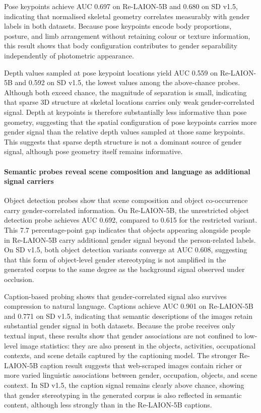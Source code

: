 Pose keypoints achieve AUC 0.697 on Re-LAION-5B and 0.680 on SD v1.5, indicating that normalised skeletal geometry correlates measurably with gender labels in both datasets. Because pose keypoints encode body proportions, posture, and limb arrangement without retaining colour or texture information, this result shows that body configuration contributes to gender separability independently of photometric appearance.

Depth values sampled at pose keypoint locations yield AUC 0.559 on Re-LAION-5B and 0.592 on SD v1.5, the lowest values among the above-chance probes. Although both exceed chance, the magnitude of separation is small, indicating that sparse 3D structure at skeletal locations carries only weak gender-correlated signal. Depth at keypoints is therefore substantially less informative than pose geometry, suggesting that the spatial configuration of pose keypoints carries more gender signal than the relative depth values sampled at those same keypoints. This suggests that sparse depth structure is not a dominant source of gender signal, although pose geometry itself remains informative.

\paragraph{Semantic probes reveal scene composition and language as additional signal carriers}

Object detection probes show that scene composition and object co-occurrence carry gender-correlated information. On Re-LAION-5B, the unrestricted object detection probe achieves AUC 0.692, compared to 0.615 for the restricted variant. This 7.7 percentage-point gap indicates that objects appearing alongside people in Re-LAION-5B carry additional gender signal beyond the person-related labels. On SD v1.5, both object detection variants converge at AUC 0.608, suggesting that this form of object-level gender stereotyping is not amplified in the generated corpus to the same degree as the background signal observed under occlusion.

Caption-based probing shows that gender-correlated signal also survives compression to natural language. Captions achieve AUC 0.901 on Re-LAION-5B and 0.771 on SD v1.5, indicating that semantic descriptions of the images retain substantial gender signal in both datasets. Because the probe receives only textual input, these results show that gender associations are not confined to low-level image statistics: they are also present in the objects, activities, occupational contexts, and scene details captured by the captioning model. The stronger Re-LAION-5B caption result suggests that web-scraped images contain richer or more varied linguistic associations between gender, occupation, objects, and scene context. In SD v1.5, the caption signal remains clearly above chance, showing that gender stereotyping in the generated corpus is also reflected in semantic content, although less strongly than in the Re-LAION-5B captions.

